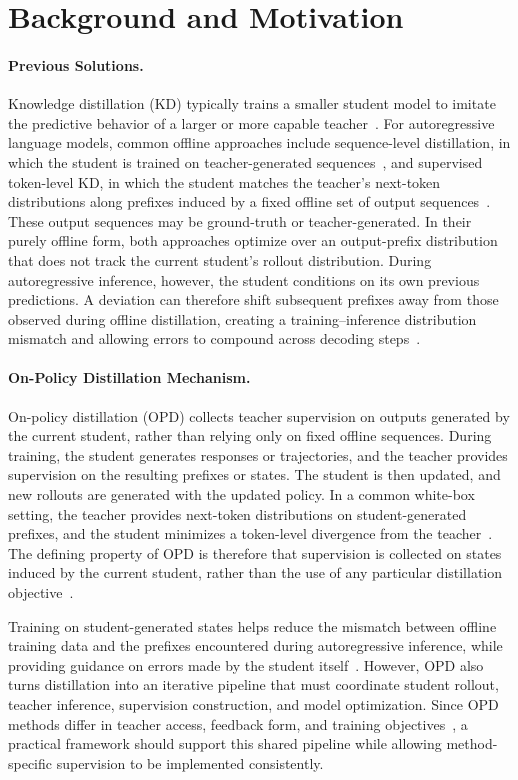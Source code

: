 \section{Background and Motivation}

\paragraph{Previous Solutions.}
Knowledge distillation (KD) typically trains a smaller student model to imitate the predictive behavior of a larger or more capable teacher~\citep{hinton2015distilling_kd,ko2024distillm_opd}. For autoregressive language models, common offline approaches include sequence-level distillation, in which the student is trained on teacher-generated sequences~\citep{kim2016sequence}, and supervised token-level KD, in which the student matches the teacher's next-token distributions along prefixes induced by a fixed offline set of output sequences~\citep{agarwal2024onpolicy_opsd}. These output sequences may be ground-truth or teacher-generated. In their purely offline form, both approaches optimize over an output-prefix distribution that does not track the current student's rollout distribution. During autoregressive inference, however, the student conditions on its own previous predictions. A deviation can therefore shift subsequent prefixes away from those observed during offline distillation, creating a training--inference distribution mismatch and allowing errors to compound across decoding steps~\citep{lin2020imitkd,agarwal2024onpolicy_opsd}.


\paragraph{On-Policy Distillation Mechanism.}
On-policy distillation (OPD) collects teacher supervision on outputs generated by the current student, rather than relying only on fixed offline sequences. During training, the student generates responses or trajectories, and the teacher provides supervision on the resulting prefixes or states. The student is then updated, and new rollouts are generated with the updated policy. In a common white-box setting, the teacher provides next-token distributions on student-generated prefixes, and the student minimizes a token-level divergence from the teacher~\citep{agarwal2024onpolicy_opsd}. The defining property of OPD is therefore that supervision is collected on states induced by the current student, rather than the use of any particular distillation objective~\citep{lu2025onpolicydistillation,song2026survey}.

Training on student-generated states helps reduce the mismatch between offline training data and the prefixes encountered during autoregressive inference, while providing guidance on errors made by the student itself~\citep{agarwal2024onpolicy_opsd,ko2024distillm_opd}. However, OPD also turns distillation into an iterative pipeline that must coordinate student rollout, teacher inference, supervision construction, and model optimization. Since OPD methods differ in teacher access, feedback form, and training objectives~\citep{song2026survey}, a practical framework should support this shared pipeline while allowing method-specific supervision to be implemented consistently.
